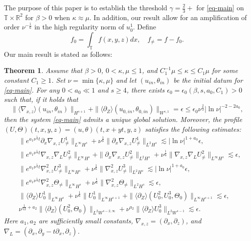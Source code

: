\documentclass[12pt]{article}
\newcommand{\wtb}{\langle\partial_Z\rangle }
\newtheorem{theorem}{Theorem}[section]
\numberwithin{equation}{section}
\begin{document}
	The purpose of this paper is to establish the threshold $\gamma=\frac{2}{3}+$ for \eqref{eq-main} on $\mathbb{T}\times\mathbb{R}^2$ for $\beta>0$ when $\kappa\approx\mu$. In addition, our result allow for an amplification of order $\nu^{-\frac{1}{6}}$ in the high regularity norm of $u^1_0$. Define
	\begin{equation*}
		f_0=\int_{\mathbb{T}}f(x,y,z)dx,\quad f_{\neq}=f-f_0.
	\end{equation*}
    Our main result is stated as follows:
	\begin{theorem}\label{mainthe}
		Assume that $\beta>0$, $0<\kappa,\mu\leq1$, and $C_1^{-1}\mu\leq\kappa\leq C_1\mu$ for some constant $C_1\geq1$. Set $\nu=\min\{\kappa,\mu\}$ and let $(u_{in},\theta_{in})$ be the initial datum for \eqref{eq-main}. For any $0<a_0\ll1$ and $s\geq4$, there exists $\epsilon_0=\epsilon_0(\beta,s,a_0,C_1)>0$ such that, if it holds that
		\begin{equation}
			\|\langle \nabla_{x,z}\rangle (u_{in},\theta_{in})\|_{H^{s+1}}+\|\wtb(u_{0,in},\theta_{0,in})\|_{W^{s,1}}=\epsilon\leq\epsilon_0\nu^{\frac{2}{3}}|\ln{\nu}|^{-2-2a_0},
		\end{equation}
		then the system \eqref{eq-main} admits a unique global solution. Moreover, the profile $(U,\Theta)(t,x,y,z)=(u,\theta)(t,x+yt,y,z)$ satisfies the following estimates:
		\begin{subequations}\label{est-main}
			\begin{align}
				&\|e^{a_1\nu^{\frac{1}{3}}t}\partial_x\nabla_{x,z}U^1_{\neq}\|_{L^\infty H^s}+\nu^{\frac{1}{6}}\|\partial_x\nabla_{x,z}U^1_{\neq}\|_{L^2H^s}\lesssim|\ln\nu|^{1+a_0}\epsilon,\label{main-u1}\\
				&\|e^{a_1\nu^{\frac{1}{3}}t}\nabla_{x,z}\nabla_LU^2_{\neq}\|_{L^\infty H^s}+\|\partial_x\nabla_{x,z}U^2_{\neq}\|_{L^2 H^s}+\nu^{\frac{1}{6}}\|\nabla_{x,z}\nabla_LU^2_{\neq}\|_{L^\infty H^s}\lesssim\epsilon,\label{main-u2}\\
				&\|e^{a_1\nu^{\frac{1}{3}}t}\nabla_{x,z}^2U^3_{\neq}\|_{L^\infty H^s}+\nu^{\frac{1}{6}}\|\nabla_{x,z}^2U^3_{\neq}\|_{L^2H^s}\lesssim|\ln\nu|^{1+a_0}\epsilon,\label{main-u3}\\
				&\|e^{a_1\nu^{\frac{1}{3}}t}\nabla_{x,z}^2\Theta_{\neq}\|_{L^\infty H^s}+\nu^{\frac{1}{6}}\|\nabla_{x,z}^2\Theta_{\neq}\|_{L^2H^s}\lesssim\epsilon,\label{main-theta}\\
				&\|\wtb U^1_0\|_{L^\infty H^s}+\nu^{\frac{1}{6}}\| U^1_0\|_{L^\infty H^{s+1}}+\|\wtb (U^{2}_0,U^3_0,\Theta_0)\|_{L^\infty H^{s+1}}\lesssim\epsilon,\label{main-u10}\\
				&\nu^{\frac{1}{12}+a_2}\|\wtb(U^2_0,\Theta_0)\|_{L^2W^{s-2,\infty}}+\nu^{a_2}\|\wtb U^3_{0}\|_{L^2W^{s-1}}\lesssim\epsilon.\label{main-u230}
			\end{align}
		\end{subequations}
		Here $a_1,a_2$ are sufficiently small constants, $\nabla_{x,z}=(\partial_x,\partial_z)$, and $\nabla_L=(\partial_x,\partial_y-t\partial_x,\partial_z)$.
	\end{theorem}
\end{document}
